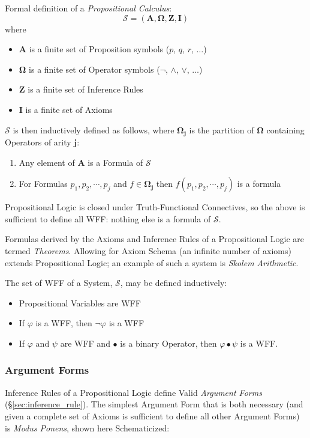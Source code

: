 Formal definition of a \emph{Propositional Calculus}:
\[
    \mathcal{S} = (\mathbf{A},\mathbf{\Omega},\mathbf{Z},\mathbf{I})
\]
where
\begin{itemize}
\item $\mathbf{A}$ is a finite set of Proposition symbols ($p$, $q$,
  $r$, $\ldots$)
\item $\mathbf{\Omega}$ is a finite set of Operator symbols ($\neg$,
  $\wedge$, $\vee$, $\ldots$)
\item $\mathbf{Z}$ is a finite set of Inference Rules
\item $\mathbf{I}$ is a finite set of Axioms
\end{itemize}
$\mathcal{S}$ is then inductively defined as follows, where
$\mathbf{\Omega_j}$ is the partition of $\mathbf{\Omega}$ containing
Operators of arity $\mathbf{j}$:
\begin{enumerate}
\item Any element of $\mathbf{A}$ is a Formula of $\mathcal{S}$
\item For Formulas $p_1, p_2, \cdots, p_j$ and $f \in
  \mathbf{\Omega_j}$ then $f(p_1, p_2, \cdots, p_j)$ is a formula
\end{enumerate}
Propositional Logic is closed under Truth-Functional Connectives, so
the above is sufficient to define all WFF: nothing else is a formula
of $\mathcal{S}$.

Formulas derived by the Axioms and Inference Rules of a Propositional
Logic are termed \emph{Theorems}. Allowing for Axiom Schema (an
infinite number of axioms) extends Propositional Logic; an example of
such a system is \emph{Skolem Arithmetic}\cite{skolem23}.

The set of WFF of a System, $\mathcal{S}$, may be defined inductively:
\begin{itemize}
\item Propositional Variables are WFF
\item If $\varphi$ is a WFF, then $\neg\varphi$ is a WFF
\item If $\varphi$ and $\psi$ are WFF and $\bullet$ is a binary Operator,
  then $\varphi \bullet \psi$ is a WFF.
\end{itemize}

\subsubsection{Argument Forms}

Inference Rules of a Propositional Logic define Valid \emph{Argument
  Forms} (\S\ref{sec:inference_rule}). The simplest Argument Form
that is both necessary (and given a complete set of Axioms is
sufficient to define all other Argument Forms) is \emph{Modus Ponens},
shown here Schematicized:

